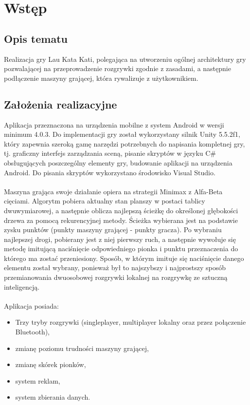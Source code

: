 \newpage\section{Wstęp}
\subsection{Opis tematu}
Realizacja gry Lau Kata Kati, polegająca na utworzeniu ogólnej architektury gry pozwalającej na przeprowadzenie rozgrywki zgodnie z zasadami, a następnie podłączenie maszyny grającej, która rywalizuje z użytkownikiem.\\

\subsection{Założenia realizacyjne}
Aplikacja przeznaczona na urządzenia mobilne z system Android w wersji minimum 4.0.3. Do implementacji gry został wykorzystany silnik Unity 5.5.2f1, który zapewnia szeroką gamę narzędzi potrzebnych do napisania kompletnej gry, tj. graficzny interfejs zarządzania sceną, pisanie skryptów w języku C\# obsługujących poszczególny elementy gry, budowanie aplikacji na urządzenia Android. Do pisania skryptów wykorzystano środowisko Visual Studio.\\
\\
Maszyna grająca swoje działanie opiera na strategii Minimax z Alfa-Beta cięciami. Algorytm pobiera aktualny stan planszy w postaci tablicy dwuwymiarowej, a następnie oblicza najlepszą ścieżkę do określonej głębokości drzewa za pomocą rekurencyjnej metody. Ścieżka wybierana jest na podstawie zysku punktów (punkty maszyny grającej - punkty gracza). Po wybraniu najlepszej drogi, pobierany jest z niej pierwszy ruch, a następnie wywołuje się metodę imitującą naciśnięcie odpowiedniego pionka i punktu przeznaczenia do którego ma zostać przeniesiony. Sposób, w którym imituje się naciśnięcie danego elementu został wybrany, ponieważ był to najszybszy i najprostszy sposób przemianowania dwuosobowej rozgrywki lokalnej na rozgrywkę ze sztuczną inteligencją.\\
\\
Aplikacja posiada:
\begin{itemize}
	\item Trzy tryby rozgrywki (singleplayer, multiplayer lokalny oraz przez połączenie Bluetooth),
	
	\item zmianę poziomu trudności maszyny grającej,
	
	\item zmianę skórek pionków,
	
	\item system reklam, 
	
	\item system zbierania danych.
\end{itemize}
